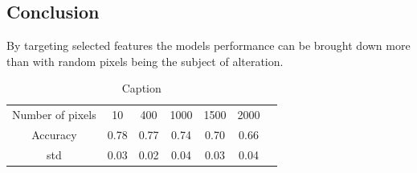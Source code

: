 \documentclass{article}
\begin{document}
\subsection{Conclusion}
By targeting selected features the models performance can be brought down more than with random pixels being the subject of alteration.
\begin{table}[H]
    \centering
    \begin{tabular}{c|c|c|c|c|c|c}
        Number of pixels & 10 &  400  & 1000 & 1500 &2000  \\
        Accuracy & 0.78 & 0.77 & 0.74 & 0.70 & 0.66\\
        std & 0.03 & 0.02& 0.04 & 0.03 & 0.04\\
        
    \end{tabular}
    \caption{Caption}
    \label{pixel accuracy 2e}
\end{table}
\end{document}
